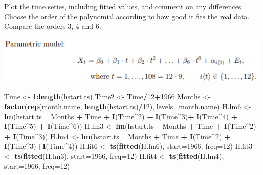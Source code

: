 \documentclass[
]{article}
\newenvironment{Shaded}{\begin{snugshade}}{\end{snugshade}}
\newcommand{\DataTypeTok}[1]{\textcolor[rgb]{0.13,0.29,0.53}{#1}}
\newcommand{\DecValTok}[1]{\textcolor[rgb]{0.00,0.00,0.81}{#1}}
\newcommand{\KeywordTok}[1]{\textcolor[rgb]{0.13,0.29,0.53}{\textbf{#1}}}
\newcommand{\NormalTok}[1]{#1}
\newcommand{\OperatorTok}[1]{\textcolor[rgb]{0.81,0.36,0.00}{\textbf{#1}}}
\newcommand{\StringTok}[1]{\textcolor[rgb]{0.31,0.60,0.02}{#1}}
\begin{document}
Plot the time series, including fitted values, and comment on any
differences. Choose the order of the polynomial according to how good it
fits the real data. Compare the orders 3, 4 and 6.

\includegraphics[width=0.5\linewidth]{parametric}

\begin{Shaded}
\begin{Highlighting}[]
\NormalTok{Time <-}\StringTok{ }\DecValTok{1}\OperatorTok{:}\KeywordTok{length}\NormalTok{(hstart.ts)}
\NormalTok{Time2 <-}\StringTok{ }\NormalTok{Time}\OperatorTok{/}\DecValTok{12}\OperatorTok{+}\DecValTok{1966}
\NormalTok{Months <-}\StringTok{ }\KeywordTok{factor}\NormalTok{(}\KeywordTok{rep}\NormalTok{(month.name, }\KeywordTok{length}\NormalTok{(hstart.ts)}\OperatorTok{/}\DecValTok{12}\NormalTok{), }\DataTypeTok{levels=}\NormalTok{month.name)}
\NormalTok{H.lm6 <-}\StringTok{ }\KeywordTok{lm}\NormalTok{(hstart.ts }\OperatorTok{~}\StringTok{ }\NormalTok{Months }\OperatorTok{+}\StringTok{ }\NormalTok{Time }\OperatorTok{+}\StringTok{ }\KeywordTok{I}\NormalTok{(Time}\OperatorTok{^}\DecValTok{2}\NormalTok{) }\OperatorTok{+}\StringTok{ }\KeywordTok{I}\NormalTok{(Time}\OperatorTok{^}\DecValTok{3}\NormalTok{)}\OperatorTok{+}\StringTok{ }\KeywordTok{I}\NormalTok{(Time}\OperatorTok{^}\DecValTok{4}\NormalTok{) }\OperatorTok{+}\StringTok{ }\KeywordTok{I}\NormalTok{(Time}\OperatorTok{^}\DecValTok{5}\NormalTok{) }\OperatorTok{+}\StringTok{ }\KeywordTok{I}\NormalTok{(Time}\OperatorTok{^}\DecValTok{6}\NormalTok{))}
\NormalTok{H.lm3 <-}\StringTok{ }\KeywordTok{lm}\NormalTok{(hstart.ts }\OperatorTok{~}\StringTok{ }\NormalTok{Months }\OperatorTok{+}\StringTok{ }\NormalTok{Time }\OperatorTok{+}\StringTok{ }\KeywordTok{I}\NormalTok{(Time}\OperatorTok{^}\DecValTok{2}\NormalTok{) }\OperatorTok{+}\StringTok{ }\KeywordTok{I}\NormalTok{(Time}\OperatorTok{^}\DecValTok{3}\NormalTok{))}
\NormalTok{H.lm4 <-}\StringTok{ }\KeywordTok{lm}\NormalTok{(hstart.ts }\OperatorTok{~}\StringTok{ }\NormalTok{Months }\OperatorTok{+}\StringTok{ }\NormalTok{Time }\OperatorTok{+}\StringTok{ }\KeywordTok{I}\NormalTok{(Time}\OperatorTok{^}\DecValTok{2}\NormalTok{) }\OperatorTok{+}\StringTok{ }\KeywordTok{I}\NormalTok{(Time}\OperatorTok{^}\DecValTok{3}\NormalTok{)}\OperatorTok{+}\KeywordTok{I}\NormalTok{(Time}\OperatorTok{^}\DecValTok{4}\NormalTok{))}
\NormalTok{H.fit6 <-}\StringTok{ }\KeywordTok{ts}\NormalTok{(}\KeywordTok{fitted}\NormalTok{(H.lm6), }\DataTypeTok{start=}\DecValTok{1966}\NormalTok{, }\DataTypeTok{freq=}\DecValTok{12}\NormalTok{)}
\NormalTok{H.fit3 <-}\StringTok{ }\KeywordTok{ts}\NormalTok{(}\KeywordTok{fitted}\NormalTok{(H.lm3), }\DataTypeTok{start=}\DecValTok{1966}\NormalTok{, }\DataTypeTok{freq=}\DecValTok{12}\NormalTok{)}
\NormalTok{H.fit4 <-}\StringTok{ }\KeywordTok{ts}\NormalTok{(}\KeywordTok{fitted}\NormalTok{(H.lm4), }\DataTypeTok{start=}\DecValTok{1966}\NormalTok{, }\DataTypeTok{freq=}\DecValTok{12}\NormalTok{)}
\end{Highlighting}
\end{Shaded}
\end{document}
